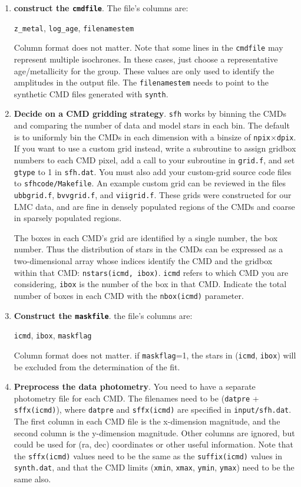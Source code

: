 \documentclass[12pt]{book}
\def\ttg{\tt\color{DarkGreen}}
\def\tto{\tt\color{myOrange}}
\begin{document}
\begin{enumerate}
\item {\bf construct the {\tto cmdfile}}.  The file's columns are:

\medskip\noindent
{\tto z\_metal}, {\tto log\_age}, {\tto filenamestem}

\medskip\noindent
Column format does not matter.  Note that some lines in the
{\tto cmdfile} may represent multiple isochrones.  In these cases, 
just choose a representative age/metallicity for the group.  These 
values are only used to identify the amplitudes in the output file.  
The {\tto filenamestem} needs to point to the synthetic CMD files 
generated with {\ttg synth}.

\item {\bf Decide on a CMD gridding strategy}.  {\ttg sfh} works by 
binning the CMDs and comparing the number of data and model stars in 
each bin.  The default is to uniformly bin the CMDs in each dimension 
with a binsize of {\tto npix}$\times${\tto dpix}.  If you want to use 
a custom grid instead, write a subroutine to assign gridbox numbers to 
each CMD pixel, add a call to your subroutine in {\ttg grid.f}, and 
set {\tto gtype} to 1 in {\ttg sfh.dat}.  You must also add your 
custom-grid source code files to {\ttg sfhcode/Makefile}.  An example 
custom grid can be reviewed in the files {\ttg ubbgrid.f}, 
{\ttg bvvgrid.f}, and {\ttg viigrid.f}.  These grids were constructed 
for our LMC data, and are fine in densely populated regions of the 
CMDs and coarse in sparsely populated regions.

The boxes in each CMD's grid are identified by a single number, the
box number.  Thus the distribution of stars in the CMDs can be
expressed as a two-dimensional array whose indices identify the CMD
and the gridbox within that CMD: {\tt nstars(icmd, ibox)}. 
{\tt icmd} refers to which CMD you are considering, {\tt ibox} is the 
number of the box in that CMD.  Indicate the total number of boxes in 
each CMD with the {\tto nbox(icmd)} parameter. 

\item {\bf Construct the {\tto maskfile}}.  the file's columns are:

\medskip\noindent
{\tto icmd},  {\tto ibox},  {\tto maskflag}

\medskip\noindent
Column format does not matter.  if {\tto maskflag}=1, the stars in 
({\tt icmd}, {\tt ibox}) will be excluded from the determination of 
the fit.

\item {\bf  Preprocess the data photometry}.  You need to have a 
separate photometry file for each CMD.  The filenames need to be 
({\tto datpre} + {\tto sffx(icmd)}), where {\tto datpre} and 
{\tto sffx(icmd)} are specified in {\ttg input/sfh.dat}.  The first 
column in each CMD file is the x-dimension magnitude, and the second 
column is the y-dimension magnitude.  Other columns are ignored, but 
could be used for (ra, dec) coordinates or other useful information.   
Note that the {\tto sffx(icmd)} values need to be the same as the 
{\tto suffix(icmd)} values in {\ttg synth.dat}, and that the CMD 
limits ({\tto xmin}, {\tto xmax}, {\tto ymin}, {\tto ymax}) need to be 
the same also.


\end{enumerate}
\end{document}
